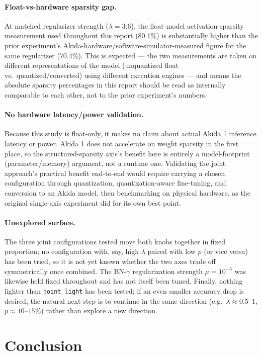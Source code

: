 \documentclass[11pt]{article}
\newcommand{\code}[1]{\texttt{#1}}
\begin{document}
\paragraph{Float-vs-hardware sparsity gap.} At matched regularizer strength ($\lambda=3.6$), the float-model activation-sparsity measurement used throughout this report (80.1\%) is substantially higher than the prior experiment's Akida-hardware/software-simulator-measured figure for the same regularizer (70.4\%). This is expected --- the two measurements are taken on different representations of the model (unquantized float vs.\ quantized/converted) using different execution engines --- and means the absolute sparsity percentages in this report should be read as internally comparable to each other, not to the prior experiment's numbers.

\paragraph{No hardware latency/power validation.} Because this study is float-only, it makes no claim about actual Akida 1 inference latency or power. Akida 1 does not accelerate on weight sparsity in the first place, so the structured-sparsity axis's benefit here is entirely a model-footprint (parameter/memory) argument, not a runtime one. Validating the joint approach's practical benefit end-to-end would require carrying a chosen configuration through quantization, quantization-aware fine-tuning, and conversion to an Akida model, then benchmarking on physical hardware, as the original single-axis experiment did for its own best point.

\paragraph{Unexplored surface.} The three joint configurations tested move both knobs together in fixed proportion; no configuration with, say, high $\lambda$ paired with low $p$ (or vice versa) has been tried, so it is not yet known whether the two axes trade off symmetrically once combined. The BN-$\gamma$ regularization strength $\mu=10^{-5}$ was likewise held fixed throughout and has not itself been tuned. Finally, nothing lighter than \code{joint\_light} has been tested; if an even smaller accuracy drop is desired, the natural next step is to continue in the same direction (e.g.\ $\lambda\approx0.5$--$1$, $p\approx10$--$15\%$) rather than explore a new direction.

\section{Conclusion}
\end{document}
